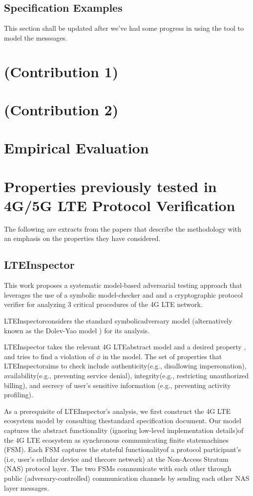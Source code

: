 \documentclass[acmsmall,review,authorversion]{acmart}
\begin{document}
\subsection{Specification Examples}
This section shall be updated after we've had some progress in using the tool to model the messsages. 

\section{(Contribution 1)}

\section{(Contribution 2)}

\section{Empirical Evaluation}

\section{Properties previously tested in 4G/5G LTE Protocol Verification}
The following are extracts from the papers that describe the methodology with an emphasis on the properties they have considered. 
\subsection{LTEInspector}
This work proposes a systematic model-based adversarial testing approach that leverages the use of a symbolic model-checker and and a cryptographic protocol verifier for analyzing 3 critical procedures of the 4G LTE network. 

LTEInspectorconsiders the standard symbolicadversary model (alternatively known as the Dolev-Yao model ) for its analysis.

 LTEInspector takes the relevant 4G LTEabstract model  and a desired property , and tries to find a violation of $\phi$ in the model. The set of properties that LTEInspectoraims to check include authenticity(e.g., disallowing impersonation), availability(e.g., preventing service denial), integrity(e.g., restricting unauthorized billing), and secrecy of user’s sensitive information (e.g., preventing activity profiling).
 
 As a prerequisite of LTEInspector’s analysis, we first construct the 4G LTE ecosystem model by consulting thestandard specification document.  Our model captures the abstract functionality (ignoring low-level implementation details)of the 4G LTE ecosystem as synchronous communicating finite statemachines (FSM). Each FSM captures the stateful functionalityof a protocol participant’s (i.e, user’s cellular device and thecore network) at the Non-Access Stratum (NAS) protocol layer. The two FSMs communicate with each other through public (adversary-controlled) communication channels by sending each other NAS layer messages.
 
\end{document}
